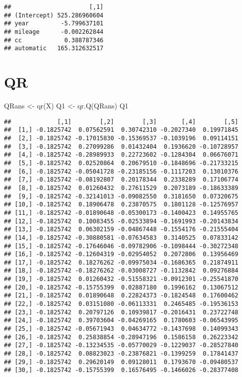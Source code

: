 \documentclass[
]{book}
\newenvironment{Shaded}{\begin{snugshade}}{\end{snugshade}}
\newcommand{\FunctionTok}[1]{\textcolor[rgb]{0.00,0.00,0.00}{#1}}
\newcommand{\NormalTok}[1]{#1}
\newcommand{\OtherTok}[1]{\textcolor[rgb]{0.56,0.35,0.01}{#1}}
\begin{document}
\begin{verbatim}
##                      [,1]
## (Intercept) 525.286960604
## year         -5.799637101
## mileage      -0.002262844
## cc            0.388787346
## automatic   165.312632517
\end{verbatim}

\hypertarget{qr}{%
\section{QR}\label{qr}}

\begin{Shaded}
\begin{Highlighting}[]
\NormalTok{QRans }\OtherTok{\textless{}{-}} \FunctionTok{qr}\NormalTok{(X)}
\NormalTok{Q1 }\OtherTok{\textless{}{-}} \FunctionTok{qr.Q}\NormalTok{(QRans)}
\NormalTok{Q1}
\end{Highlighting}
\end{Shaded}

\begin{verbatim}
##             [,1]        [,2]        [,3]       [,4]        [,5]
##  [1,] -0.1825742  0.07562591  0.30742310 -0.2027340  0.19971845
##  [2,] -0.1825742 -0.17015830 -0.15369537 -0.1039196  0.09114151
##  [3,] -0.1825742  0.27099286  0.01432404  0.1936620 -0.10728957
##  [4,] -0.1825742 -0.28989933  0.22723602 -0.1284304  0.06676071
##  [5,] -0.1825742  0.02520864  0.20679510 -0.1848696 -0.21733215
##  [6,] -0.1825742 -0.05041728 -0.23185156 -0.1117203  0.13010376
##  [7,] -0.1825742 -0.08192807  0.20178344  0.2338289  0.17106774
##  [8,] -0.1825742  0.01260432  0.27611529  0.2073189 -0.18633389
##  [9,] -0.1825742 -0.32141013 -0.09082550  0.3181650  0.07320675
## [10,] -0.1825742  0.18906478  0.23870575  0.1801128 -0.12576957
## [11,] -0.1825742 -0.01890648 -0.05300173 -0.1400423  0.14955765
## [12,] -0.1825742  0.10083455 -0.02533894 -0.1691993 -0.20143834
## [13,] -0.1825742  0.06302159 -0.04867448 -0.1554176 -0.21555404
## [14,] -0.1825742 -0.30880581 -0.07634583  0.3140525  0.07833142
## [15,] -0.1825742 -0.17646046 -0.09782906 -0.1098444 -0.30272348
## [16,] -0.1825742 -0.12604319 -0.02954052  0.2072806  0.13956469
## [17,] -0.1825742  0.18276262 -0.09975034 -0.1686365  0.21874911
## [18,] -0.1825742 -0.18276262 -0.03008727 -0.1132842  0.09276884
## [19,] -0.1825742  0.01260432 -0.51558321 -0.0912301 -0.25541870
## [20,] -0.1825742 -0.15755399  0.02887180  0.1996162  0.13067512
## [21,] -0.1825742  0.01890648  0.22824373 -0.1824548  0.17600462
## [22,] -0.1825742  0.03151080 -0.06113331  0.2465485 -0.19536153
## [23,] -0.1825742  0.20797126  0.10939817 -0.2016431  0.23722748
## [24,] -0.1825742  0.39703604 -0.04269165  0.1780603 -0.06543995
## [25,] -0.1825742 -0.05671943  0.04634772 -0.1437698  0.14099343
## [26,] -0.1825742  0.25838854 -0.28947196  0.1586158  0.26223342
## [27,] -0.1825742 -0.13234535 -0.05770029 -0.1229037 -0.28527840
## [28,] -0.1825742  0.08823023 -0.23876821 -0.1399259  0.17841437
## [29,] -0.1825742  0.29620149  0.09128011  0.1793670 -0.09480537
## [30,] -0.1825742 -0.15755399  0.16576495 -0.1466026 -0.28377408
\end{verbatim}
\end{document}
